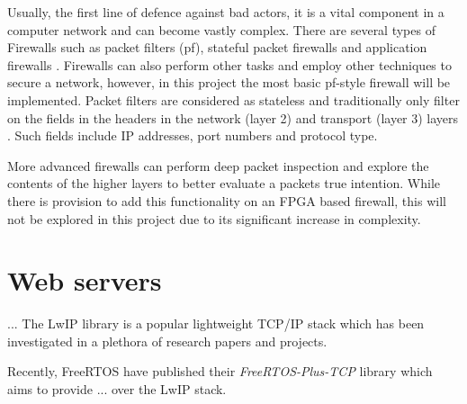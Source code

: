 Usually, the first line of defence against bad actors, it is a vital component in a computer network and can become vastly complex. There are several
types of Firewalls such as packet filters (pf), stateful packet firewalls and application firewalls \cite{FirewallsBook}. Firewalls can also perform 
other tasks and employ other techniques to secure a network, however, in this project the most basic pf-style firewall will be implemented. 
Packet filters are considered as stateless and traditionally only filter on the fields in the headers in the network (layer 2) and transport 
(layer 3) layers \cite{FirewallsBook}. Such fields include IP addresses, port numbers and protocol type.

More advanced firewalls can perform deep packet inspection and explore the contents of the higher layers to better evaluate a packets true intention. 
While there is provision to add this functionality on an FPGA based firewall, this will not be explored in this project due to its significant increase 
in complexity. 


\section{Web servers}
... The LwIP library is a popular lightweight TCP/IP stack which has been investigated in a plethora of research papers and projects. 


Recently, FreeRTOS have published their \textit{FreeRTOS-Plus-TCP} library which aims to provide ... over the LwIP stack. 






